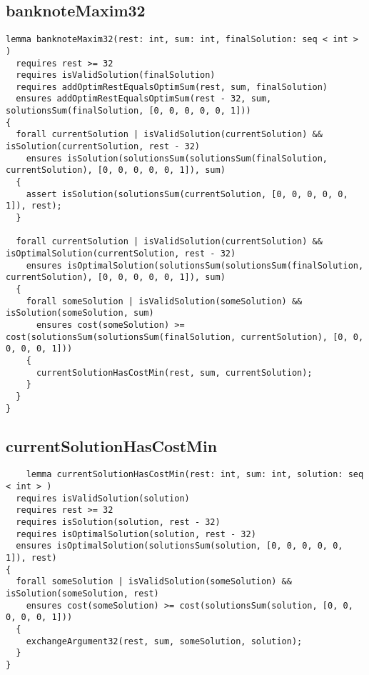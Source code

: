 \subsection{banknoteMaxim32}
\begin{lstlisting}
lemma banknoteMaxim32(rest: int, sum: int, finalSolution: seq < int > )
  requires rest >= 32
  requires isValidSolution(finalSolution)
  requires addOptimRestEqualsOptimSum(rest, sum, finalSolution)
  ensures addOptimRestEqualsOptimSum(rest - 32, sum, solutionsSum(finalSolution, [0, 0, 0, 0, 0, 1])) 
{
  forall currentSolution | isValidSolution(currentSolution) && isSolution(currentSolution, rest - 32)
    ensures isSolution(solutionsSum(solutionsSum(finalSolution, currentSolution), [0, 0, 0, 0, 0, 1]), sum) 
  {
    assert isSolution(solutionsSum(currentSolution, [0, 0, 0, 0, 0, 1]), rest);
  }

  forall currentSolution | isValidSolution(currentSolution) && isOptimalSolution(currentSolution, rest - 32)
    ensures isOptimalSolution(solutionsSum(solutionsSum(finalSolution, currentSolution), [0, 0, 0, 0, 0, 1]), sum)
  {
    forall someSolution | isValidSolution(someSolution) && isSolution(someSolution, sum)
      ensures cost(someSolution) >= cost(solutionsSum(solutionsSum(finalSolution, currentSolution), [0, 0, 0, 0, 0, 1])) 
    {
      currentSolutionHasCostMin(rest, sum, currentSolution);
    }
  }
}
\end{lstlisting}

\subsection{currentSolutionHasCostMin}
\begin{lstlisting}
    lemma currentSolutionHasCostMin(rest: int, sum: int, solution: seq < int > )
  requires isValidSolution(solution)
  requires rest >= 32
  requires isSolution(solution, rest - 32)
  requires isOptimalSolution(solution, rest - 32)
  ensures isOptimalSolution(solutionsSum(solution, [0, 0, 0, 0, 0, 1]), rest) 
{
  forall someSolution | isValidSolution(someSolution) && isSolution(someSolution, rest)
    ensures cost(someSolution) >= cost(solutionsSum(solution, [0, 0, 0, 0, 0, 1])) 
  {
    exchangeArgument32(rest, sum, someSolution, solution);
  }
}

\end{lstlisting}


